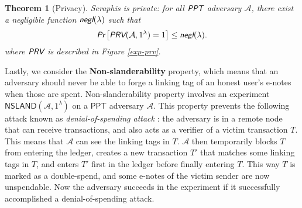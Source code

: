 \documentclass{article}
\theoremstyle{plain}
\newtheorem{theorem}{Theorem}[section]
\theoremstyle{remark}
\begin{document}
\begin{theorem}[Privacy]\label{thm-prv}
Seraphis is private: for all $\emph{\textsf{PPT}}$ adversary $\mathcal{A}$, there exist a negligible function $\emph{\textsf{negl}}(\lambda)$ such that
\begin{align*}
\emph{\textsf{Pr}}
\left[
\emph{\textsf{PRV}}(\mathcal{A}, 1^{\lambda})=1
\right]
\le \emph{\textsf{negl}}(\lambda).
\end{align*}
where $\emph{\textsf{PRV}}$ is described in Figure \ref{exp-prv}.
\end{theorem}

Lastly, we consider the \textbf{Non-slanderability} property, which means that an adversary should never be able to forge a linking tag of an honest user's e-notes when those are spent. Non-slanderability property involves an experiment $\textsf{NSLAND}(\mathcal{A}, 1^{\lambda})$ on a $\textsf{PPT}$ adversary $\mathcal{A}$. This property prevents the following attack known as \textit{denial-of-spending attack} \cite{denial-of-spend}: the adversary is in a remote node that can receive transactions, and also acts as a verifier of a victim transaction $T$. This means that $\mathcal{A}$ can see the linking tags in $T$. $\mathcal{A}$ then temporarily blocks $T$ from entering the ledger, creates a new transaction $T'$ that matches some linking tags in $T$, and enters $T'$ first in the ledger before finally entering $T$. This way $T$ is marked as a double-spend, and some e-notes of the victim sender are now unspendable. Now the adversary succeeds in the experiment if it successfully accomplished a denial-of-spending attack.
\end{document}
